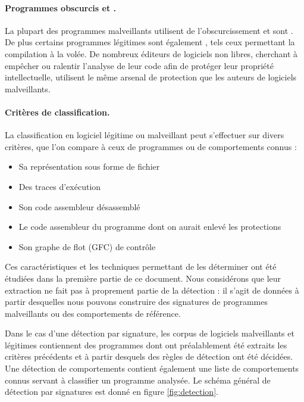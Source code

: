 \paragraph{Programmes obscurcis et \sms.}
La plupart des programmes malveillants utilisent de l'obscurcissement et sont \sms.
De plus certains programmes légitimes sont également \sms, tels ceux permettant la compilation à la volée.
De nombreux éditeurs de logiciels non libres, cherchant à empêcher ou ralentir l'analyse de leur code afin de protéger leur propriété intellectuelle, utilisent le même arsenal de protection que les auteurs de logiciels malveillants.

\paragraph{Critères de classification.}
La classification en logiciel légitime ou malveillant peut s'effectuer sur divers critères, que l'on compare à ceux de programmes ou de comportements connus :
\begin{itemize}
 \item Sa représentation sous forme de fichier
 \item Des traces d'exécution
 \item Son code assembleur désassemblé
 \item Le code assembleur du programme dont on aurait enlevé les protections
 \item Son graphe de flot (GFC) de contrôle
\end{itemize}

Ces caractéristiques et les techniques permettant de les déterminer ont été étudiées dans la première partie de ce document.
Nous considérons que leur extraction ne fait pas à proprement partie de la détection : il s'agit de données à partir desquelles nous pouvons construire des signatures de programmes malveillants ou des comportements de référence.

Dans le cas d'une détection par signature, les corpus de logiciels malveillants et légitimes contiennent des programmes dont ont préalablement été extraits les critères précédents et à partir desquels des règles de détection ont été décidées.
Une détection de comportements contient également une liste de comportements connus servant à classifier un programme analysée. Le schéma général de détection par signatures est donné en figure \ref{fig:detection}.

